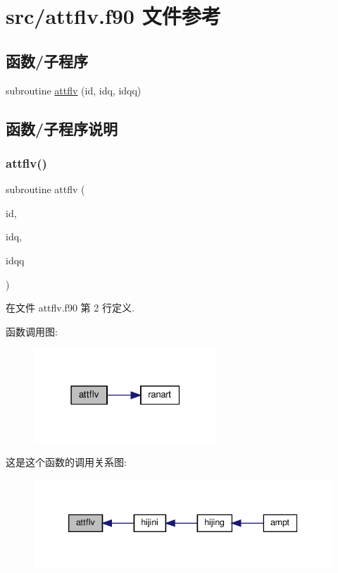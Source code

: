 \hypertarget{attflv_8f90}{}\section{src/attflv.f90 文件参考}
\label{attflv_8f90}
\subsection*{函数/子程序}
\begin{DoxyCompactItemize}
\item 
subroutine \mbox{\hyperlink{attflv_8f90_a7599bef876a2bfbc4c7286e115b3e1be}{attflv}} (id, idq, idqq)
\end{DoxyCompactItemize}


\subsection{函数/子程序说明}
\mbox{\label{attflv_8f90_a7599bef876a2bfbc4c7286e115b3e1be}} 
\subsubsection{\texorpdfstring{attflv()}{attflv()}}
{\footnotesize\ttfamily subroutine attflv (\begin{DoxyParamCaption}\item[{}]{id,  }\item[{}]{idq,  }\item[{}]{idqq }\end{DoxyParamCaption})}



在文件 attflv.\+f90 第 2 行定义.

函数调用图\+:
\nopagebreak
\begin{figure}[H]
\begin{center}
\leavevmode
\includegraphics[width=195pt]{attflv_8f90_a7599bef876a2bfbc4c7286e115b3e1be_cgraph}
\end{center}
\end{figure}
这是这个函数的调用关系图\+:
\nopagebreak
\begin{figure}[H]
\begin{center}
\leavevmode
\includegraphics[width=339pt]{attflv_8f90_a7599bef876a2bfbc4c7286e115b3e1be_icgraph}
\end{center}
\end{figure}
